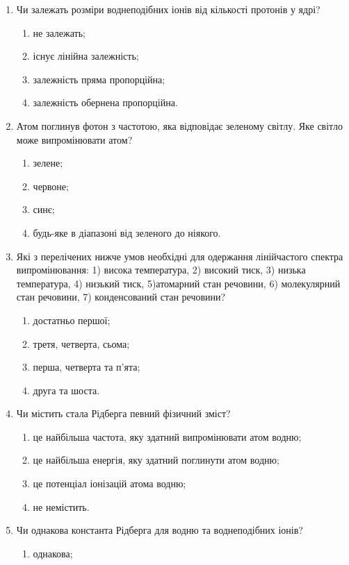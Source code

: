 \documentclass[twocolumn]{el-author}
\begin{document}
\begin{enumerate}
	\item Чи залежать розміри воднеподібних іонів від кількості протонів у ядрі?
	\begin{enumerate}
		\item не залежать;
		\item існує лінійна залежність;
		\item залежність пряма пропорційна;
		\item залежність обернена пропорційна.
	\end{enumerate}
	\item Атом поглинув фотон з частотою, яка відповідає зеленому світлу. Яке
світло може випромінювати атом?
	\begin{enumerate}
		\item зелене;
		\item червоне;
		\item синє;
		\item будь-яке в діапазоні від зеленого до ніякого.
	\end{enumerate}
	\item Які з перелічених нижче умов необхідні для одержання лінійчастого
спектра випромінювання: 1) висока температура, 2) високий тиск,
3) низька температура, 4) низький тиск, 5)атомарний стан речовини,
6) молекулярний стан речовини, 7) конденсований стан речовини?
	\begin{enumerate}
		\item достатньо першої;
		\item третя, четверта, сьома;
		\item перша, четверта та п'ята;
		\item друга та шоста.
	\end{enumerate}
	\item Чи містить стала Рідберга певний фізичний зміст?
	\begin{enumerate}
		\item це найбільша частота, яку здатний випромінювати атом водню;
		\item це найбільша енергія, яку здатний поглинути атом водню;
		\item це потенціал іонізацій атома водню;
		\item не немістить.
	\end{enumerate}
	\item Чи однакова константа Рідберга для водню та воднеподібних іонів?
	\begin{enumerate}
		\item однакова;

\end{enumerate}
\end{enumerate}
\end{document}
